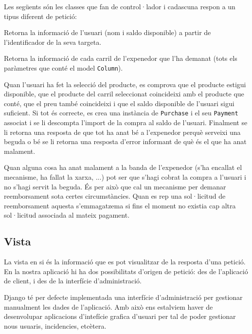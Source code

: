 Les següents són les classes que fan de control·lador i cadascuna respon a un tipus diferent de petició:
\begin{description}[font=\normalfont\textbf]\itemsep2pt 
\vspace{-1em}
\parskip1pt 
\item[GetUserDataFromCard] Retorna la informació de l'usuari (nom i saldo disponible) a partir de l'identificador de la seva targeta.
\item[GetVenderColumns] Retorna la informació de cada carril de l'expenedor que l'ha demanat (tots els paràmetres que conté el model \texttt{Column}).
\item[ProductPurchase] Quan l'usuari ha fet la selecció del producte, es comprova que el producte estigui disponible, que el producte del carril seleccionat coincideixi amb el producte que conté, que el preu també coincideixi i que el saldo disponible de l'usuari sigui suficient. Si tot és correcte, es crea una instància de \texttt{Purchase} i el seu \texttt{Payment} associat i se li descompta l'import de la compra al saldo de l'usuari. Finalment se li retorna una resposta de que tot ha anat bé a l'expenedor perquè serveixi una beguda o bé se li retorna una resposta d'error informant de què és el que ha anat malament.
\item[RequestCancelPayment] Quan alguna cosa ha anat malament a la banda de l'expenedor (s'ha encallat el mecanisme, ha fallat la xarxa, ...) pot ser que s'hagi cobrat la compra a l'usuari i no s'hagi servit la beguda. És per això que cal un mecanisme per demanar reemborsament sota certes circumstàncies. Quan es rep una sol·licitud de reemborsament aquesta s'emmagatzema si fins el moment no existia cap altra sol·licitud associada al mateix pagament.
\vspace{-1em}
\end{description}

\subsection{Vista}
La vista en si és la informació que es pot visualitzar de la resposta d'una petició.
En la nostra aplicació hi ha dos possibilitats d'origen de petició: des de l'aplicació de client, i des de la interfície d'administració.

Django té per defecte implementada una interfície d'administració per gestionar manualment les dades de l'aplicació. Amb això ens estalviem haver de desenvolupar aplicacions d'intefície grafica d'usuari per tal de poder gestionar nous usuaris, incidencies, etcètera.

